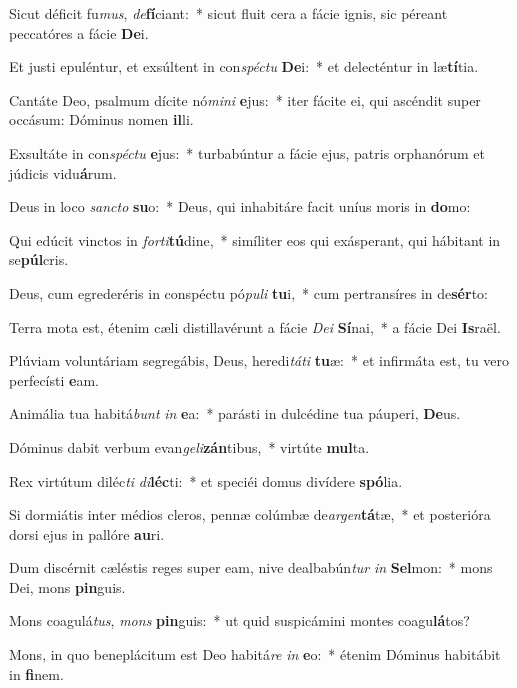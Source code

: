 \item Sicut déficit fu\textit{mus}, \textit{de}\textbf{fí}ciant:~* sicut fluit cera a fácie ignis, sic péreant peccatóres a fácie \textbf{De}i.
\item Et justi epuléntur, et exsúltent in con\textit{spéc}\textit{tu} \textbf{De}i:~* et delecténtur in læ\textbf{tí}tia.
\item Cantáte Deo, psalmum dícite nó\textit{mi}\textit{ni} \textbf{e}jus:~* iter fácite ei, qui ascéndit super occásum: Dóminus nomen \textbf{il}li.
\item Exsultáte in con\textit{spéc}\textit{tu} \textbf{e}jus:~* turbabúntur a fácie ejus, patris orphanórum et júdicis vidu\textbf{á}rum.
\item Deus in loco \textit{sanc}\textit{to} \textbf{su}o:~* Deus, qui inhabitáre facit uníus moris in \textbf{do}mo:
\item Qui edúcit vinctos in \textit{for}\textit{ti}\textbf{tú}dine,~* simíliter eos qui exásperant, qui hábitant in se\textbf{púl}cris.
\item Deus, cum egrederéris in conspéctu pó\textit{pu}\textit{li} \textbf{tu}i,~* cum pertransíres in de\textbf{sér}to:
\item Terra mota est, étenim cæli distillavérunt a fácie \textit{De}\textit{i} \textbf{Sí}nai,~* a fácie Dei \textbf{Is}raël.
\item Plúviam voluntáriam segregábis, Deus, heredi\textit{tá}\textit{ti} \textbf{tu}æ:~* et infirmáta est, tu vero perfecísti \textbf{e}am.
\item Animália tua habitá\textit{bunt} \textit{in} \textbf{e}a:~* parásti in dulcédine tua páuperi, \textbf{De}us.
\item Dóminus dabit verbum evan\textit{ge}\textit{li}\textbf{zán}tibus,~* virtúte \textbf{mul}ta.
\item Rex virtútum diléc\textit{ti} \textit{di}\textbf{léc}ti:~* et speciéi domus divídere \textbf{spó}lia.
\item Si dormiátis inter médios cleros, pennæ colúmbæ de\textit{ar}\textit{gen}\textbf{tá}tæ,~* et posterióra dorsi ejus in pallóre \textbf{au}ri.
\item Dum discérnit cæléstis reges super eam, nive dealbabún\textit{tur} \textit{in} \textbf{Sel}mon:~* mons Dei, mons \textbf{pin}guis.
\item Mons coagulá\textit{tus}, \textit{mons} \textbf{pin}guis:~* ut quid suspicámini montes coagu\textbf{lá}tos?
\item Mons, in quo beneplácitum est Deo habitá\textit{re} \textit{in} \textbf{e}o:~* étenim Dóminus habitábit in \textbf{fi}nem.

